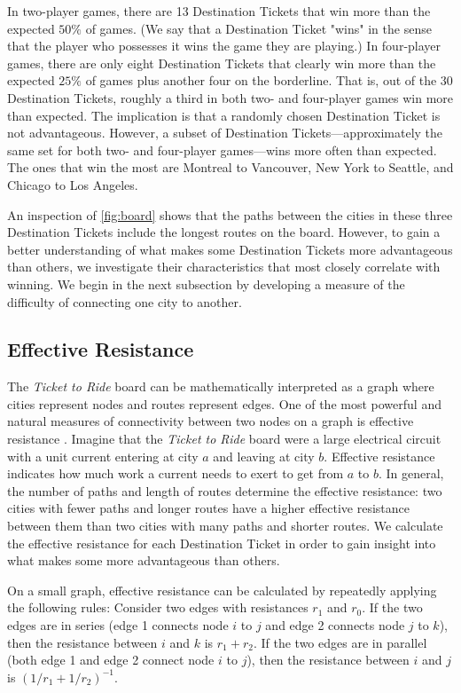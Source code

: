 In two-player games, there are 13 Destination Tickets 
that win more than the expected $50\%$ of games.
(We say that a Destination Ticket "wins" in the sense
that the player who possesses it wins the game they
are playing.)
In four-player games, there are only eight Destination Tickets
that clearly win more than the expected $25\%$ of games plus
another four on the borderline.
That is, out of the 30 Destination Tickets, roughly a third
in both two- and four-player games win more than expected.
The implication is that a randomly chosen Destination 
Ticket is not advantageous.
However, a subset of Destination Tickets---approximately the same
set for both two- and four-player games---wins more often than expected.
The ones that win the most are Montreal to Vancouver,
New York to Seattle, and Chicago to Los Angeles.

An inspection of \cref{fig:board} shows that the paths between 
the cities in these three Destination
Tickets include the longest routes on the board.
However, to gain a better understanding of what makes some
Destination Tickets more advantageous than others,
we investigate their characteristics
that most closely correlate with winning.
We begin in the next subsection by developing a measure
of the difficulty of connecting one city to another.

\subsection{Effective Resistance}
\label{sec:resistance}
The \textit{Ticket to Ride} board can be mathematically
interpreted as a graph where cities represent
nodes and routes represent edges.
One of the most powerful and natural measures of connectivity
between two nodes on a graph is effective resistance
\cite{ellens2011effective}.
Imagine that the \textit{Ticket to Ride} board were
a large electrical circuit with a unit current
entering at city $a$ and leaving at city $b$.
Effective resistance indicates
how much work a current needs to exert
to get from $a$ to $b$.
In general, the number of paths and length of routes 
determine the effective resistance:
two cities with fewer paths and longer routes
have a higher effective resistance between them
than two cities with many paths and shorter routes.
We calculate the effective resistance for each 
Destination Ticket in order to gain insight
into what makes some more advantageous than others.

On a small graph, effective resistance can be calculated
by repeatedly applying the following rules:
Consider two edges with resistances $r_1$ and $r_0$.
If the two edges are in series (edge 1 connects node $i$ to $j$
and edge 2 connects node $j$ to $k$), then the resistance between
$i$ and $k$ is $r_1 + r_2$.
If the two edges are in parallel (both edge 1 and edge 2 connect
node $i$ to $j$), then the resistance between $i$ and $j$
is $(1/r_1 + 1/r_2)^{-1}$.

